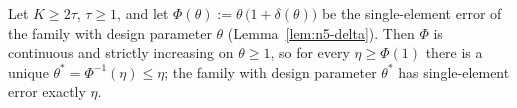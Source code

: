 \begin{lemma}\label{lem:n5-mono}
Let $K\ge 2\tau$, $\tau\ge1$, and let
$\Phi(\theta):=\theta\,\bigl(1+\delta(\theta)\bigr)$ be the single-element error
of the family with design parameter $\theta$ (Lemma~\ref{lem:n5-delta}).  Then
$\Phi$ is continuous and strictly increasing on $\theta\ge1$, so for every
$\eta\ge\Phi(1)$ there is a unique $\theta^{\ast}=\Phi^{-1}(\eta)\le\eta$; the
family with design parameter $\theta^{\ast}$ has single-element error exactly
$\eta$.
\end{lemma}
%


